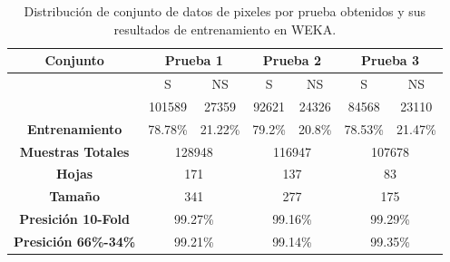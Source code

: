 \documentclass[twoside,spanish,ESP,MSc]{plantillaLabUPV}
\theoremstyle{definition}
\begin{document}
\begin{table}[!tbh]
	\caption{Distribución de conjunto de datos de pixeles por prueba obtenidos y sus resultados de entrenamiento en WEKA.}
	\label{pixet}
	\centering
	\begin{tabular}{|c|c|c|c|c|c|c|}
		\hline
		\textbf{Conjunto}                             & \multicolumn{2}{c|}{\textbf{Prueba 1}}               & \multicolumn{2}{c|}{\textbf{Prueba 2}}               & \multicolumn{2}{c|}{\textbf{Prueba 3}}               \\ \hline
		& {\color[HTML]{000000} S} & {\color[HTML]{000000} NS} & {\color[HTML]{000000} S} & {\color[HTML]{000000} NS} & {\color[HTML]{000000} S} & {\color[HTML]{000000} NS} \\ \cline{2-7} 
		& 101589                   & 27359                     & 92621                        & 24326                         & 84568                        & 23110                         \\ \cline{2-7} 
		\multirow{-3}{*}{\textbf{Entrenamiento}} & 78.78\%                  & 21.22\%                   & 79.2\%                      & 20.8\%                       & 78.53\%                      & 21.47\%                       \\ \hline
		\textbf{Muestras Totales}                & \multicolumn{2}{c|}{{\color[HTML]{000000} 128948}}   & \multicolumn{2}{c|}{{\color[HTML]{000000} 116947}}      & \multicolumn{2}{c|}{{\color[HTML]{000000} 107678}}      \\ \hline
		\textbf{Hojas}             & \multicolumn{2}{c|}{171}                         & \multicolumn{2}{c|}{137}                             & \multicolumn{2}{c|}{83}                             \\ \hline
		\textbf{Tamaño}             & \multicolumn{2}{c|}{341}                         & \multicolumn{2}{c|}{277}                             & \multicolumn{2}{c|}{175}                             \\ \hline
		\textbf{Presición 10-Fold}               & \multicolumn{2}{c|}{99.27\%}                         & \multicolumn{2}{c|}{99.16\%}                             & \multicolumn{2}{c|}{99.29\%}                             \\ \hline
		\textbf{Presición 66\%-34\%}             & \multicolumn{2}{c|}{99.21\%}                         & \multicolumn{2}{c|}{99.14\%}                             & \multicolumn{2}{c|}{99.35\%}                             \\ \hline
	\end{tabular}
\end{table}
\end{document}
